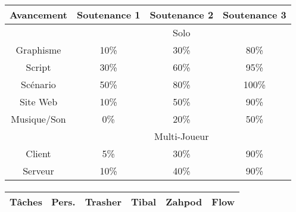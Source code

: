 \documentclass[12pt,a4paper]{article}
\begin{document}
\paragraph{}
\begin{center}
\begin{tabular}{|c|c|c|c|}
\hline 
\rowcolor{cyan} Avancement & Soutenance 1 & Soutenance 2 & Soutenance 3 \\ 
\hline 
\cellcolor{lightgray} &\multicolumn{3}{|c|}{\cellcolor{lightgray} Solo } \\
\hline 
\cellcolor{lightgray}Graphisme & \cellcolor{yellow} 10\% & \cellcolor{yellow} 30\% & \cellcolor{orange} 80\%\\ 
\hline 
\cellcolor{lightgray}Script & \cellcolor{yellow} 30\% &  \cellcolor{orange} 60\% & \cellcolor{red} 95\% \\ 
\hline 
\cellcolor{lightgray}Scénario & \cellcolor{orange} 50\%&  \cellcolor{orange}80\% &  \cellcolor{red}100\% \\ 
\hline 
\cellcolor{lightgray}Site Web & \cellcolor{yellow} 10\% &  \cellcolor{orange}50\% & \cellcolor{red} 90\% \\ 
\hline
\cellcolor{lightgray}Musique/Son & 0\% & \cellcolor{yellow} 20\% &  \cellcolor{orange} 50\% \\ 
\hline 
\cellcolor{lightgray} &\multicolumn{3}{|c|}{\cellcolor{lightgray} Multi-Joueur } \\
\hline 
\cellcolor{lightgray} Client & \cellcolor{yellow} 5\% & \cellcolor{orange} 30\% & \cellcolor{red} 90\% \\ 
\hline 
\cellcolor{lightgray} Serveur & \cellcolor{yellow} 10\% & \cellcolor{orange} 40\% & \cellcolor{red} 90\% \\ 
\hline 

\end{tabular}
\paragraph{}
\begin{tabular}{|c|c|c|c|c|}
 \hline 
 \rowcolor{cyan}Tâches \ Pers. & Trasher & Tibal & Zahpod & Flow \\ 
 \hline 
 

\end{tabular}
\end{center}
\end{document}

